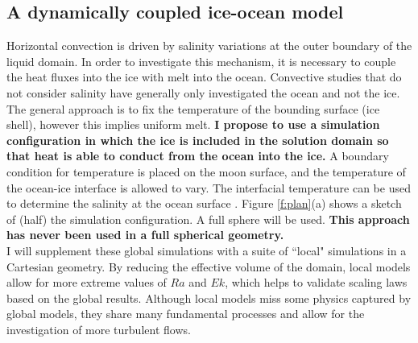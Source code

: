 \documentclass[12pt]{article}
\begin{document}
\subsection{A dynamically coupled ice-ocean model}

Horizontal convection is driven by salinity variations at the outer boundary of the liquid domain. In order to investigate this mechanism, it is necessary to couple the heat fluxes into the ice with melt into the ocean. 
Convective studies that do not consider salinity have generally only investigated the ocean \citep{kS19,dL23} and not the ice. The general approach is to fix the temperature of the bounding surface (ice shell), however this implies uniform melt.
\textbf{I propose to use a simulation configuration in which the ice is included in the solution domain so that heat is able to conduct from the ocean into the ice.} 
A boundary condition for temperature is placed on the moon surface, and the temperature of the ocean-ice interface is allowed to vary. The interfacial temperature can be used to determine the salinity at the ocean surface \citep{wK22}.
Figure \ref{f:plan}(a) shows a sketch of (half) the simulation configuration. A full sphere will be used.
\textbf{This approach has never been used in a full spherical geometry.}\\

I will supplement these global simulations with a suite of ``local" simulations in a Cartesian geometry. By reducing the effective volume of the domain, local models allow for more extreme values of $Ra$ and $Ek$, which helps to validate scaling laws based on the global results. Although local models miss some physics captured by global models, they share many fundamental processes and allow for the investigation of more turbulent flows.
\end{document}
